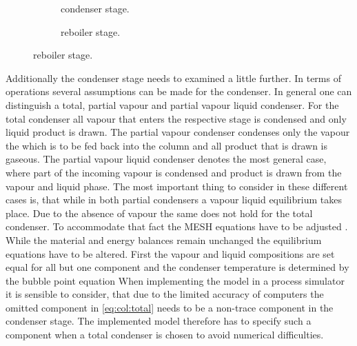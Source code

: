         \begin{figure}
            \centering
            \begin{subfigure}{0.45\textwidth}
                \centering
                
                \caption{condenser stage.}
                \label{fig:col_condenser}
            \end{subfigure}
            \begin{subfigure}{0.45\textwidth}
                \centering
                
                \caption{reboiler stage.}
                \label{fig:col_reboiler}
            \end{subfigure}
        \end{figure}

        Additionally the condenser stage needs to examined a little further. In terms of operations
        several assumptions can be made for the condenser. In general one can distinguish a total,
        partial vapour and partial vapour liquid condenser. For the total condenser all vapour that
        enters the respective stage is condensed and only liquid product is drawn. The partial vapour
        condenser condenses only the vapour the which is to be fed back into
        the column and all product that is drawn is gaseous. The partial vapour liquid condenser
        denotes the most general case, where part of the incoming vapour is condensed and product
        is drawn from the vapour and liquid phase. The most important thing to consider in these
        different cases is, that while in both partial condensers a vapour liquid equilibrium takes
        place. Due to the absence of vapour the same does not hold for the total condenser. To accommodate
        that fact the MESH equations have to be adjusted \cite{Naphtali.1971}. While the material and energy
        balances remain unchanged the equilibrium equations have to be altered. First the vapour and
        liquid compositions are set equal for all but one component
        and the condenser temperature is determined by the bubble point equation
        When implementing the model in a process simulator it is sensible to consider, that due to
        the limited accuracy of computers the omitted component in \eqref{eq:col:total} needs to be
        a non-trace component in the condenser stage. The implemented model therefore has to specify
        such a component when a total condenser is chosen to avoid numerical difficulties.

